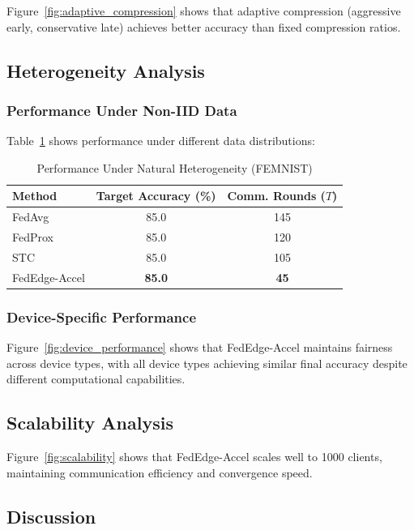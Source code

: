 \documentclass[journal]{IEEEtran}
\begin{document}
Figure~\ref{fig:adaptive_compression} shows that adaptive compression (aggressive early, conservative late) achieves better accuracy than fixed compression ratios.

\subsection{Heterogeneity Analysis}

\subsubsection{Performance Under Non-IID Data}

Table~\ref{tab:heterogeneity} shows performance under different data distributions:

\begin{table}[!t]
\centering
\caption{Performance Under Natural Heterogeneity (FEMNIST)}
\label{tab:heterogeneity}
\begin{tabularx}{\columnwidth}{lcc}
\toprule
Method & Target Accuracy (\%) & Comm. Rounds ($T$) \\
\midrule
FedAvg & 85.0 & 145 \\
FedProx & 85.0 & 120 \\
STC & 85.0 & 105 \\
FedEdge-Accel & \textbf{85.0} & \textbf{45} \\
\bottomrule
\end{tabularx}
\end{table}

\subsubsection{Device-Specific Performance}

Figure~\ref{fig:device_performance} shows that FedEdge-Accel maintains fairness across device types, with all device types achieving similar final accuracy despite different computational capabilities.

\subsection{Scalability Analysis}

Figure~\ref{fig:scalability} shows that FedEdge-Accel scales well to 1000 clients, maintaining communication efficiency and convergence speed.

\subsection{Discussion}
\end{document}
